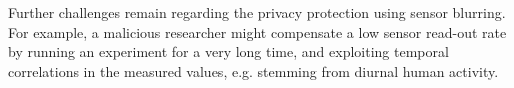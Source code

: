 Further challenges remain regarding the privacy protection
using sensor blurring. For example, 
a malicious researcher might compensate 
a low sensor read-out rate by running an experiment for a 
very long time, and exploiting temporal correlations in the measured 
values, e.g. stemming from diurnal human activity.
